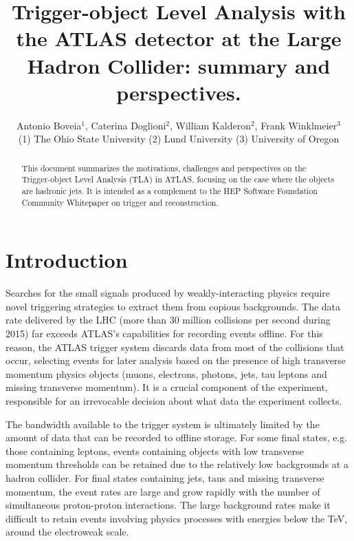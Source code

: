 \documentclass[a4paper,justified]{tufte-handout}
\title{Trigger-object Level Analysis with the ATLAS detector at the Large Hadron Collider: summary and perspectives.}
\author[Experiment]{Antonio Boveia$^1$, Caterina Doglioni$^2$, William Kalderon$^2$, Frank Winklmeier$^3$\\
(1) The Ohio State University (2) Lund University (3) University of Oregon}
\begin{document}

\maketitle%


\begin{fullwidth}
\vspace{-10px}

\begin{abstract}


\noindent This document summarizes the motivations, challenges and perspectives on the Trigger-object Level Analysis (TLA) in ATLAS, focusing on the case where the objects are hadronic jets. It is intended as a complement to the HEP Software Foundation Community Whitepaper on trigger and reconstruction. 
\end{abstract}

\end{fullwidth}

\tableofcontents

\section{Introduction}\label{sec:introduction}

Searches for the small signals produced by weakly-interacting physics require novel triggering strategies to extract them from copious backgrounds. The data rate delivered by the LHC (more than 30 million collisions per second during 2015) far exceeds ATLAS's capabilities for recording events offline. For this reason, the ATLAS trigger system discards data from most of the collisions that occur, selecting events for later analysis based on the presence of high transverse momentum physics objects (muons, electrons, photons, jets, tau leptons and missing transverse momentum). It is a crucial component of the experiment, responsible for an irrevocable decision about what data the experiment collects. 

The bandwidth available to the trigger system is ultimately limited by the amount of data that can be recorded to offline storage. For some final states, e.g. those containing leptons, events containing objects with low transverse momentum thresholds can be retained due to the relatively low backgrounds at a hadron collider. For final states containing jets, taus and missing transverse momentum, the event rates are large and grow rapidly with the number of simultaneous proton-proton interactions. The large background rates make it difficult to retain events involving physics processes with energies below the TeV, around the electroweak scale. 
\end{document}
